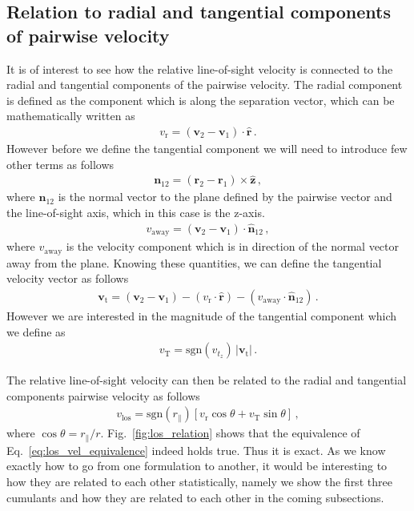 \documentclass[a4paper,fleqn,usenatbib]{mnras}
\begin{document}
	\subsection{Relation to radial and tangential components of pairwise velocity}
	
	It is of interest to see how the relative line-of-sight velocity is connected to the radial and tangential components of the pairwise velocity. The radial component is defined as the component which is along the separation vector, which can be mathematically written as
	\begin{eqnarray}	
	v_{\mathrm{r}} = \left(\mathbf{v}_2 - \mathbf{v}_1\right)\cdot \hat{\mathbf{r}} \, .
	\end{eqnarray}
	However before we define the tangential component we will need to introduce few other terms as follows
	\begin{eqnarray}
		\mathbf{n}_{12} = \left(\mathbf{r}_2 - \mathbf{r}_1\right) \times \hat{\mathbf{z}} \, ,
	\end{eqnarray}	
	\noindent where $\mathbf{n}_{12}$ is the normal vector to the plane defined by the pairwise vector and the line-of-sight axis, which in this case is the z-axis. 
	\begin{eqnarray}
	v_{\mathrm{away}} = \left(\mathbf{v}_2 - \mathbf{v}_1\right) \cdot \hat{\mathbf{n}}_{12} \, ,
	\end{eqnarray}	
	\noindent where $v_{\mathrm{away}}$ is the velocity component which is in direction of the normal vector away from the plane. Knowing these quantities, we can define the tangential velocity vector as follows
	\begin{eqnarray}
	\mathbf{v}_{\mathrm{t}} = \left(\mathbf{v}_2 - \mathbf{v}_1\right) - (v_{\mathrm{r}}\cdot \hat{\mathbf{r}}) - (v_{\mathrm{away}} \cdot \hat{\mathbf{n}}_{12}) \, .		
	\end{eqnarray}
	\noindent However we are interested in the magnitude of the tangential component which we define as
	\begin{eqnarray}
		v_{\mathrm{T}} = \mathrm{sgn}(v_{t_z})\, \lvert \mathbf{v}_{\mathrm{t}} \rvert \, .
	\end{eqnarray}
	
	 The relative line-of-sight velocity can then be related to the radial and tangential components pairwise velocity as follows
	\begin{eqnarray} \label{eq:los_vel_equivalence}
	v_{\mathrm{los}} = \mathrm{sgn}(r_{\parallel}) \left[v_{\mathrm{r}} \cos\theta + v_{\mathrm{T}}\sin\theta\right] \, ,
	\end{eqnarray}
	\noindent where $\cos\theta = r_{\parallel}/r$. Fig.~\ref{fig:los_relation} shows that the equivalence of Eq.~\ref{eq:los_vel_equivalence} indeed holds true. Thus it is exact. As we know exactly how to go from one formulation to another, it would be interesting to how they are related to each other statistically, namely we show the first three cumulants and how they are related to each other in the coming subsections.
\end{document}
